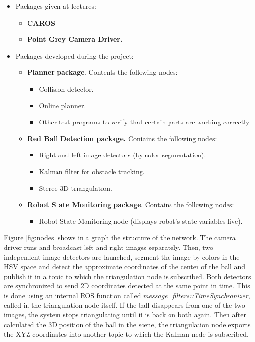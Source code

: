 \begin{itemize}
    \item Packages given at lectures:
        \begin{itemize}
            \item \textbf{CAROS}
            \item \textbf{Point Grey Camera Driver.}
        \end{itemize}
    \item Packages developed during the project:
        \begin{itemize}
            \item \textbf{Planner package.} Contents the following nodes:
                \begin{itemize}
                    \item Collision detector.
                    \item Online planner.
                    \item Other test programs to verify that certain parts are working correctly.
                \end{itemize}
            \item \textbf{Red Ball Detection package.} Contains the following nodes:
                \begin{itemize}
                    \item Right and left image detectors (by color segmentation).
                    \item Kalman filter for obstacle tracking.
                    \item Stereo 3D triangulation.
                \end{itemize}
            \item \textbf{Robot State Monitoring package.} Contains the following nodes:
                \begin{itemize}
                    \item Robot State Monitoring node (displays robot's state variables live).
                \end{itemize}
        \end{itemize}
\end{itemize}

Figure \ref{fig:nodes} shows in a graph the structure of the network. The camera driver runs and broadcast left and right images separately. Then, two independent image detectors are launched, segment the image by colors in the HSV space and detect the approximate coordinates of the center of the ball and publish it in a topic to which the triangulation node is subscribed. Both detectors are synchronized to send 2D coordinates detected at the same point in time. This is done using an internal ROS function called \textit{message\_filters::TimeSynchronizer}, called in the triangulation node itself. If the ball disappears from one of the two images, the system stops triangulating until it is back on both again. Then after calculated the 3D position of the ball in the scene, the triangulation node exports the XYZ coordinates into another topic to which the Kalman node is subscribed.  

